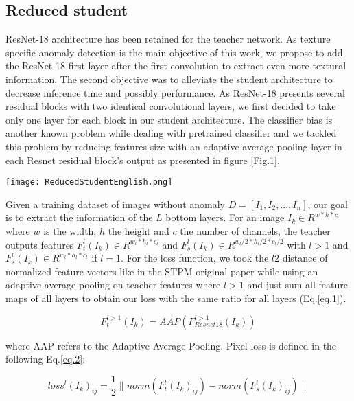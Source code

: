 \documentclass[a4paper,twoside]{article}
\begin{document}
\subsection{Reduced student} 
 ResNet-18 architecture has been retained for the teacher network. As  texture specific anomaly detection is the main objective of this work, we propose to add the ResNet-18 first layer after the first convolution to extract even more textural information. The second objective was to alleviate the student architecture to decrease inference time and possibly performance. As ResNet-18 presents several residual blocks with two identical convolutional layers, we first decided to take only one layer for each block in our student architecture. The classifier bias is another known problem while dealing with pretrained classifier and we tackled this problem by reducing features size with an adaptive average pooling layer in each Resnet residual block's output as presented in figure \ref{Fig.1}.\\
\begin{figure*}[b]
\centerline{\texttt{[image: ReducedStudentEnglish.png]}}
\renewcommand{\arraystretch}{1}
\caption{ 
Reduced student architecture with AP for adaptive average pooling. }
\label{Fig.1}
\end{figure*}


\noindent Given a training dataset of images without anomaly ${D=[I_1,I_2,...,I_n]}$, our goal is to extract the information of the $L$ bottom layers. For an image ${I_k} \in R^{w*h*c}$ where $w$ is the width, $h$ the height and $c$ the number of channels, the teacher outputs features $F_t^l(I_k) \in R^{w_l*h_l*c_l}$ and $F_s^l(I_k) \in R^{w_l/2*h_l/2*c_l/2}$ with $l>1 $ and $F_s^l(I_k) \in R^{w_l*h_l*c_l}$ if $l=1$. For the loss function, we took the $l2$ distance of normalized feature vectors like in the STPM original paper \citep{wang_student-teacher_2021} while using an adaptive average pooling on teacher features where $l>1$ and just sum all feature maps of all layers to obtain our loss with the same ratio for all layers (Eq.\ref{eq.1}). 


\begin{equation}
F_t^{l>1}(I_k)=AAP(F_{Resnet18}^{l>1}(I_k))
\label{eq.1}
\end{equation}

\noindent where AAP refers to the Adaptive Average Pooling. Pixel loss is defined in the following Eq.\ref{eq.2}: 

\begin{equation}
loss^{l}(I_k)_{ij}=\frac{1}{2}\lVert norm(F_t^l(I_k)_{ij})-norm(F_s^l(I_k)_{ij}) \rVert 
\label{eq.2}
\end{equation}
\end{document}
